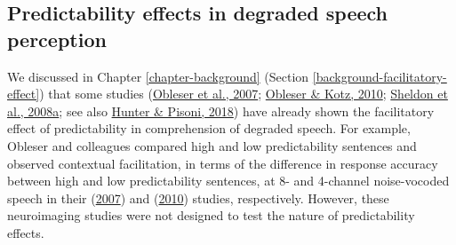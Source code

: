 \documentclass[a4paper, nobind]{templates/ociamthesis}
\begin{document}
\hypertarget{predictability-effects-in-degraded-speech-perception}{%
\subsection{Predictability effects in degraded speech perception}\label{predictability-effects-in-degraded-speech-perception}}

We discussed in Chapter \ref{chapter-background} (Section \ref{background-facilitatory-effect})
that some studies (\protect\hyperlink{ref-Obleser2007}{Obleser et al., 2007}; \protect\hyperlink{ref-Obleser2010}{Obleser \& Kotz, 2010}; \protect\hyperlink{ref-Sheldon2008a}{Sheldon et al., 2008a}; see also \protect\hyperlink{ref-Hunter2018}{Hunter \& Pisoni, 2018}) have already shown the facilitatory effect of predictability in comprehension of degraded speech.
For example, Obleser and colleagues compared high and low predictability sentences and observed contextual facilitation, in terms of the difference in response accuracy between high and low predictability sentences, at 8- and 4-channel noise-vocoded speech in their (\protect\hyperlink{ref-Obleser2007}{2007}) and (\protect\hyperlink{ref-Obleser2010}{2010}) studies, respectively.
However, these neuroimaging studies were not designed to test the nature of predictability effects.
\end{document}
